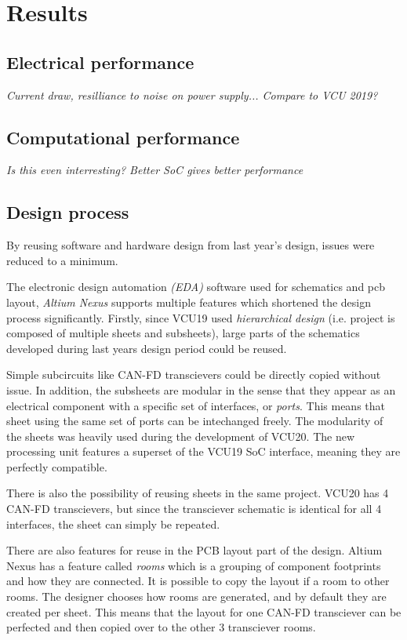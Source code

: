 \section{Results}

\subsection{Electrical performance}

\emph{Current draw, resilliance to noise on power supply... Compare to VCU 2019?}

\subsection{Computational performance}

\emph{Is this even interresting? Better SoC gives better performance}

\subsection{Design process}

By reusing software and hardware design from last year's design, issues were reduced to a minimum.

The electronic design automation \emph{(EDA)} software used for schematics and pcb layout, \emph{Altium Nexus} supports multiple features which shortened the design process significantly. Firstly, since VCU19 used \emph{hierarchical design} (i.e. project is composed of multiple sheets and subsheets), large parts of the schematics developed during last years design period could be reused. 

Simple subcircuits like CAN-FD transcievers could be directly copied without issue. In addition, the subsheets are modular in the sense that they appear as an electrical component with a specific set of interfaces, or \emph{ports}. This means that sheet using the same set of ports can be intechanged freely. The modularity of the sheets was heavily used during the development of VCU20. The new processing unit features a superset of the VCU19 SoC interface, meaning they are perfectly compatible. 

There is also the possibility of reusing sheets in the same project. VCU20 has 4 CAN-FD transcievers, but since the transciever schematic is identical for all 4 interfaces, the sheet can simply be repeated. 

There are also features for reuse in the PCB layout part of the design. Altium Nexus has a feature called \emph{rooms} which is a grouping of component footprints and how they are connected. It is possible to copy the layout if a room to other rooms. The designer chooses how rooms are generated, and by default they are created per sheet. This means that the layout for one CAN-FD transciever can be perfected and then copied over to the other 3 transciever rooms.

